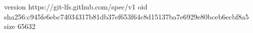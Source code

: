 version https://git-lfs.github.com/spec/v1
oid sha256:c945fe6ebc74034317b81db37ef653f64c8d15137ba7e6929e80bceb6ecbf8a5
size 65632
